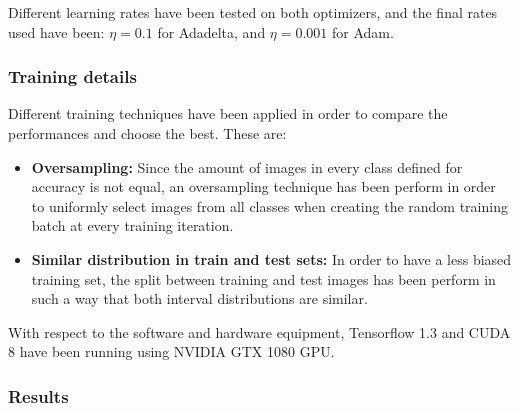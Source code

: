 \documentclass{article}
\begin{document}
Different learning rates have been tested on both optimizers, and the final rates used have been: $\eta = 0.1$ for Adadelta, and $\eta = 0.001$ for Adam.

\subsubsection{Training details}
Different training techniques have been applied in order to compare the performances and choose the best. These are:
\begin{itemize}
\item \textbf{Oversampling:} Since the amount of images in every class defined for accuracy is not equal, an oversampling technique has been perform in order to uniformly select images from all classes when creating the random training batch at every training iteration.
\item \textbf{Similar distribution in train and test sets:} In order to have a less biased training set, the split between training and test images has been perform in such a way that both interval distributions are similar.
\end{itemize}
 
With respect to the software and hardware equipment, Tensorflow 1.3 and CUDA 8 have been running using NVIDIA GTX 1080 GPU.
 	
 \subsubsection{Results}
 
\end{document}
